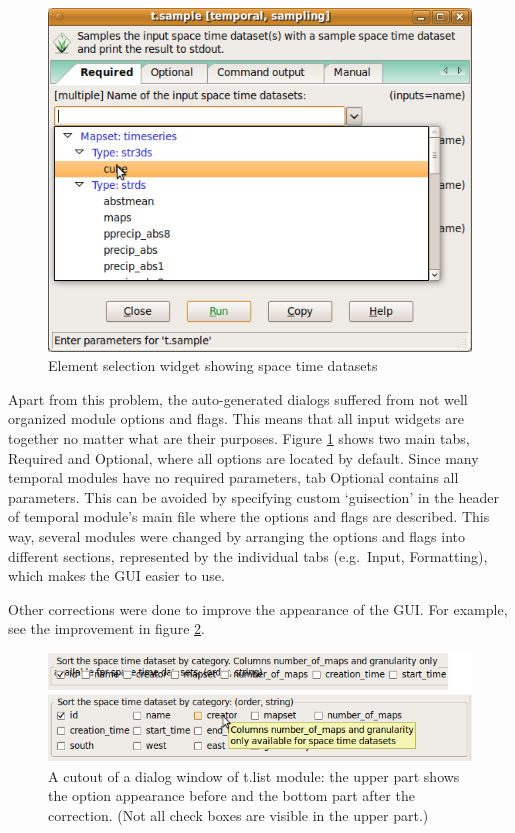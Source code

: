 \documentclass[a4paper,12pt,oneside]{book}
\newcommand{\module}[1]{\textsl{#1}}
\begin{document}
\begin{figure}[h!]
  \centering
  \includegraphics{./images/gselect.png}
  \caption{Element selection widget showing space time datasets}
  \label{fig:gselect}
\end{figure}

Apart from this problem, the auto-generated dialogs suffered from
not well organized module options and flags. This means that all input widgets
are together no matter what are their purposes.
Figure \ref{fig:gselect} shows two main tabs, Required and Optional,
where all options are located by default.
Since many temporal modules have no required parameters, tab Optional
contains all parameters. This can be avoided by specifying
custom `guisection' in the header of temporal module's main file
where the options and flags are described. This way, several modules
were changed by arranging the options and flags into different sections, represented
by the individual tabs (e.g.\ Input, Formatting), which makes the
GUI easier to use.

Other corrections were done to improve the appearance of the GUI. For example,
see the improvement in figure \ref{fig:forms}.
\begin{figure}[h!]
  \centering
  \includegraphics{./images/forms.png}
  \caption[A cutout of \module{t.list} dialog window]
  {A cutout of a dialog window of t.list module:
  the upper part shows the option appearance before and the bottom part after the correction.
  (Not all check boxes are visible in the upper part.)}
  \label{fig:forms}
\end{figure}
\end{document}
